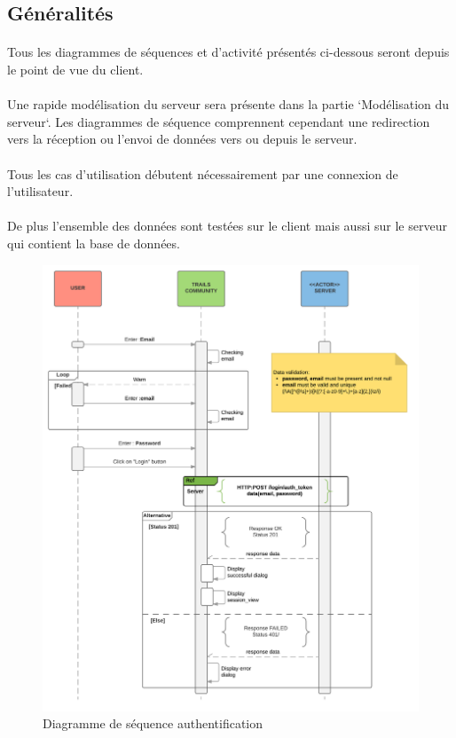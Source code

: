 \documentclass[titlepage, 12pt]{report}
\begin{document}
\subsection{Généralités}

\paragraph{}Tous les diagrammes de séquences et d'activité présentés ci-dessous seront depuis le point de vue du client.
\paragraph{}Une rapide modélisation du serveur sera présente dans la partie `Modélisation du serveur`. Les diagrammes de séquence comprennent cependant une redirection vers la réception ou l'envoi de données vers ou depuis le serveur.
\paragraph{}Tous les cas d'utilisation débutent nécessairement par une connexion de l'utilisateur.
\paragraph{}De plus l'ensemble des données sont testées sur le client mais aussi sur le serveur qui contient la base de données.


\begin{figure}[!h]
	\caption{Diagramme de séquence authentification}
	\label{authentification_sequence_diagram}
	\centering
	\includegraphics[scale=0.7]{Images/diagram/login_sequence_diagram.png}
\end{figure}
\end{document}
